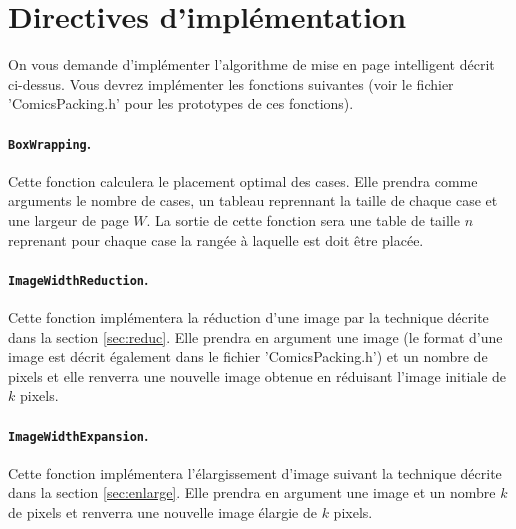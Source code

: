 \documentclass[a4paper,10pt]{article}
\begin{document}
\section{Directives d'implémentation}

On vous demande d'implémenter l'algorithme de mise en page intelligent
décrit ci-dessus. Vous devrez implémenter les fonctions suivantes
(voir le fichier 'ComicsPacking.h' pour les prototypes de ces
fonctions).

\paragraph{\texttt{BoxWrapping}.} Cette fonction calculera le placement optimal des cases. Elle prendra comme arguments le nombre de cases, un tableau reprennant la taille de chaque case et une largeur de page $W$. La sortie de cette fonction sera une table de taille $n$ reprenant pour chaque case la rangée à laquelle est doit être placée.

\paragraph{\texttt{ImageWidthReduction}.} Cette fonction implémentera la réduction d'une image par la technique décrite dans la section \ref{sec:reduc}. Elle prendra en argument une image (le format d'une image est décrit également dans le fichier 'ComicsPacking.h') et un nombre de pixels et elle renverra une nouvelle image obtenue en réduisant l'image initiale de $k$ pixels.


\paragraph{\texttt{ImageWidthExpansion}.} Cette fonction implémentera l'élargissement d'image suivant la technique décrite dans la section \ref{sec:enlarge}. Elle prendra en argument une image et un nombre $k$ de pixels et renverra une nouvelle image élargie de $k$ pixels.
\end{document}

